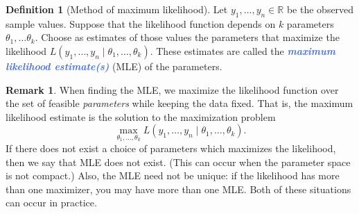 \documentclass[10pt]{article}
\theoremstyle{definition}
\newtheorem{definition}[theorem]{Definition}
\newtheorem{remark}[theorem]{Remark}
\newcommand{\1}[1]{\textbf{1}_{\left[#1\right]}} %
\def\R{\mathbb{R}} %
\newcommand{\demph}[1]{\textcolor{RoyalBlue}{\textbf{\slshape #1}}} %
\begin{document}
\begin{definition}[Method of maximum likelihood]
  \label{def:method-maximum-likelihood}
  Let $y_{1},\ldots,y_{n}\in \R$ be the observed sample values. Suppose that
  the likelihood function depends on $k$ parameters
  $\theta_{1},\ldots\theta_{k}$. Choose as estimates of those values the
  parameters that maximize the likelihood
  $L(y_{1},\ldots,y_{n}\mid \theta_{1},\ldots,\theta_{k})$. These estimates
  are called the \demph{maximum likelihood estimate(s)} (MLE) of the parameters.
\end{definition}

\begin{remark}
  When finding the MLE, we maximize the likelihood function over the set of feasible
  \textit{parameters} while keeping the data fixed. That is, the maximum
likelihood estimate is the solution to the maximization problem
  \begin{equation*}
    \max_{\theta_{1},\ldots,\theta_{k}}L(y_{1},\ldots,y_{n}\mid \theta_{1},\ldots,\theta_{k}).
  \end{equation*}
  If there does not exist a choice of parameters which maximizes the
  likelihood, then we say that MLE does not exist. (This can occur when the
  parameter space is not compact.) Also, the MLE need not be unique: if the
  likelihood has more than one maximizer, you may have more than one MLE. Both
  of these situations can occur in practice.
\end{remark}
\end{document}
